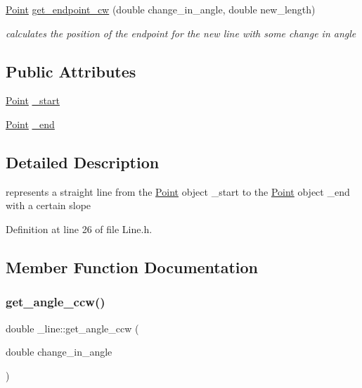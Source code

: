 \begin{DoxyCompactItemize}
\mbox{\hyperlink{struct_point}{Point}} \mbox{\hyperlink{struct__line_ac8b12b24b4b86bd4d8c09476d5b7efed}{get\+\_\+endpoint\+\_\+cw}} (double change\+\_\+in\+\_\+angle, double new\+\_\+length)
\begin{DoxyCompactList}\small\item\em calculates the position of the endpoint for the new line with some change in angle \end{DoxyCompactList}\end{DoxyCompactItemize}
\subsection*{Public Attributes}
\begin{DoxyCompactItemize}
\item 
\mbox{\hyperlink{struct_point}{Point}} \mbox{\hyperlink{struct__line_a21249c64d9d4f9818059a9c99943df4b}{\+\_\+start}}
\item 
\mbox{\hyperlink{struct_point}{Point}} \mbox{\hyperlink{struct__line_a081e0006fa57d07bfb8ef30b5056a58a}{\+\_\+end}}
\end{DoxyCompactItemize}


\subsection{Detailed Description}
represents a straight line from the \mbox{\hyperlink{struct_point}{Point}} object \+\_\+start to the \mbox{\hyperlink{struct_point}{Point}} object \+\_\+end with a certain slope 

Definition at line 26 of file Line.\+h.



\subsection{Member Function Documentation}
\mbox{\label{struct__line_ae7c7e02e80626dd3ef066c5bd4e57f33}} 
\subsubsection{\texorpdfstring{get\_angle\_ccw()}{get\_angle\_ccw()}}
{\footnotesize\ttfamily double \+\_\+line\+::get\+\_\+angle\+\_\+ccw (\begin{DoxyParamCaption}\item[{double}]{change\+\_\+in\+\_\+angle }\end{DoxyParamCaption})\hspace{0.3cm}{\ttfamily [inline]}}



